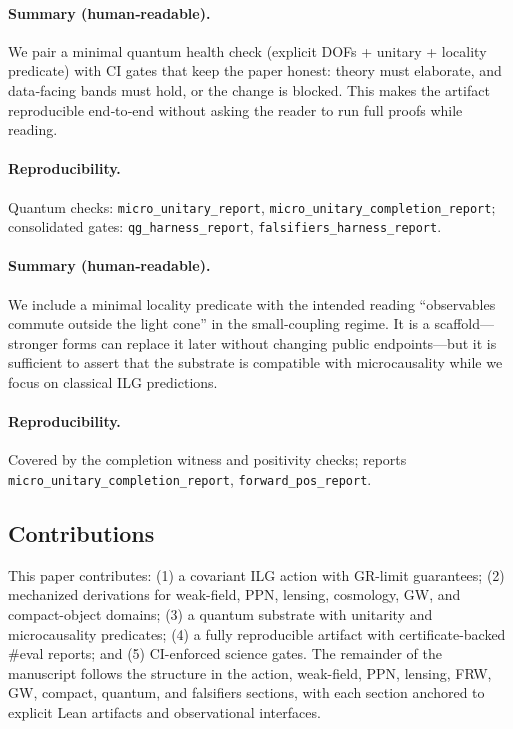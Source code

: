 \documentclass[aps,prd,twocolumn,superscriptaddress,nofootinbib,floatfix,longbibliography]{revtex4-2}
\newcommand{\lean}[1]{\texttt{\detokenize{#1}}}
\begin{document}
\paragraph*{Summary (human‑readable).}
We pair a minimal quantum health check (explicit DOFs + unitary + locality predicate) with CI gates that keep the paper honest: theory must elaborate, and data‑facing bands must hold, or the change is blocked. This makes the artifact reproducible end‑to‑end without asking the reader to run full proofs while reading.
\paragraph*{Reproducibility.}
Quantum checks: \texttt{micro\_unitary\_report}, \texttt{micro\_unitary\_completion\_report}; consolidated gates: \texttt{qg\_harness\_report}, \texttt{falsifiers\_harness\_report}. 

\paragraph*{Summary (human‑readable).}
We include a minimal locality predicate with the intended reading “observables commute outside the light cone” in the small‑coupling regime. It is a scaffold—stronger forms can replace it later without changing public endpoints—but it is sufficient to assert that the substrate is compatible with microcausality while we focus on classical ILG predictions.
\paragraph*{Reproducibility.}
Covered by the completion witness \lean{MicroUnitaryCompletionCert} and positivity checks; reports \texttt{micro\_unitary\_completion\_report}, \texttt{forward\_pos\_report}. 

\subsection{Contributions}
This paper contributes: (1) a covariant ILG action with GR-limit guarantees; (2) mechanized derivations for weak-field, PPN, lensing, cosmology, GW, and compact-object domains; (3) a quantum substrate with unitarity and microcausality predicates; (4) a fully reproducible artifact with certificate-backed \#eval reports; and (5) CI-enforced science gates. The remainder of the manuscript follows the structure in the action, weak-field, PPN, lensing, FRW, GW, compact, quantum, and falsifiers sections, with each section anchored to explicit Lean artifacts and observational interfaces.
%
\end{document}
